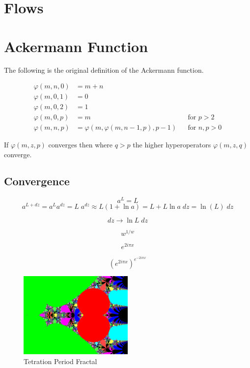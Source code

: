 \documentclass{article}
\theoremstyle{definition}
\begin{document}
\section{Flows}




\section{Ackermann Function}
The following is the original definition of the Ackermann function.

\begin{align}
\varphi(m, n, 0) &= m + n \\ \nonumber
\varphi(m, 0, 1) &= 0 \\ \nonumber
\varphi(m, 0, 2) &= 1 \\ \nonumber
\varphi(m, 0, p) &= m && \text{for } p > 2 \\ \nonumber
\varphi(m, n, p) &= \varphi(m, \varphi(m, n-1, p), p - 1) && \text{for } n, p > 0\nonumber
\end{align}

If $\varphi(m, z, p)$ converges then where $q>p$ the higher hyperoperators $\varphi(m, z, q)$ converge.

\subsection{Convergence}

$$a^L=L$$
$$a^{L+dz}=a^L a^{dz}=L\;a^{dz}\approx L(1+\ln{a})=L+L\ln{a}\;{dz}=\ln(L)\;dz$$

$${dz}\to\ln{L}\;{dz}$$

$$w^{1/w}$$

$$e^{2 i \pi  x}$$

$$\left(e^{2 i \pi  x}\right)^{e^{-2 i \pi  x}}$$

\begin{figure}
\centering
\includegraphics[width=0.5\textwidth]{period.png}
\caption{Tetration Period Fractal}
\label{fig:period}
\end{figure}
\end{document}
